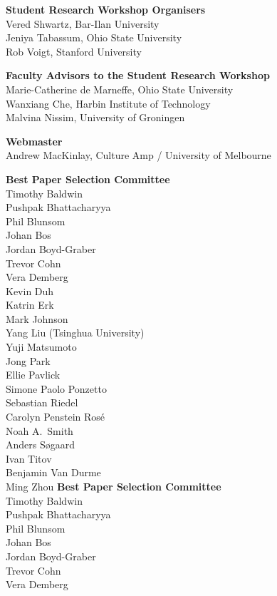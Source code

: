 {\bf Student Research Workshop Organisers} \\
Vered Shwartz, Bar-Ilan University\\
Jeniya Tabassum, Ohio State University\\
Rob Voigt, Stanford University

{\bf Faculty Advisors to the Student Research Workshop} \\
Marie-Catherine de Marneffe, Ohio State University\\
Wanxiang Che, Harbin Institute of Technology\\
Malvina Nissim, University of Groningen

{\bf Webmaster} \\
Andrew MacKinlay, Culture Amp / University of Melbourne

{\bf Best Paper Selection Committee} \\
Timothy	Baldwin \\
Pushpak	Bhattacharyya \\
Phil	Blunsom \\
Johan	Bos \\
Jordan	Boyd-Graber \\
Trevor	Cohn \\
Vera	Demberg \\
Kevin	Duh \\
Katrin	Erk \\
Mark	Johnson \\
Yang	Liu (Tsinghua University)\\
Yuji	Matsumoto \\
Jong	Park \\
Ellie	Pavlick \\
Simone Paolo	Ponzetto \\
Sebastian	Riedel \\
Carolyn	Penstein Rosé \\
Noah A.~Smith \\
Anders	Søgaard \\
Ivan	Titov \\
Benjamin	Van Durme \\
Ming	Zhou
{\bf Best Paper Selection Committee} \\
Timothy	Baldwin \\
Pushpak	Bhattacharyya \\
Phil	Blunsom \\
Johan	Bos \\
Jordan	Boyd-Graber \\
Trevor	Cohn \\
Vera	Demberg \\
